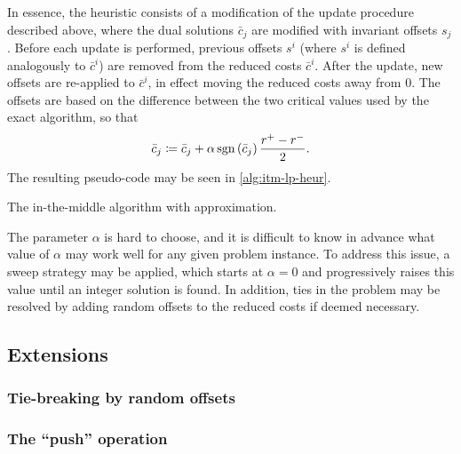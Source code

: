 In essence, the heuristic consists of a modification of the update procedure described above, where the dual solutions \(\bar{c}_j\) are modified with invariant offsets \(s_j\).
Before each update is performed, previous offsets \(s^i\) (where \(s^i\) is defined analogously to \(\bar{c}^i\)) are removed from the reduced costs \(\bar{c}^i\).
After the update, new offsets are re-applied to \(\bar{c}^i\), in effect moving the reduced costs away from \(0\).
The offsets are based on the difference between the two critical values used by the exact algorithm, so that
\begin{equation*}
	\bar{c}_j \coloneq \bar{c}_j + \alpha\operatorname{\mathrm{sgn}}\left(\bar{c}_j\right)\frac{r^+-r^-}{2}.
\end{equation*}
The resulting pseudo-code may be seen in \cref{alg:itm-lp-heur}.

\begin{algorithm}[tbp]

	\caption{The in-the-middle algorithm with approximation.}
	\label{alg:itm-lp-heur}
\end{algorithm}

The parameter \(\alpha\) is hard to choose, and it is difficult to know in advance what value of \(\alpha\) may work well for any given problem instance.
To address this issue, a sweep strategy may be applied, which starts at \(\alpha=0\) and progressively raises this value until an integer solution is found. 
In addition, ties in the problem may be resolved by adding random offsets to the reduced costs if deemed necessary.

\subsection{Extensions}
\subsubsection{Tie-breaking by random offsets}
\subsubsection{The \enquote{push} operation}
